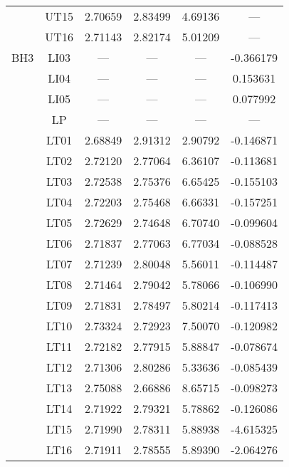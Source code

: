 \documentclass[utf8]{article}
\begin{document}
\begin{table}
{\begin{tabular}{cccccc}
            & UT15 & 2.70659 & 2.83499 & 4.69136 &     ---   \\
            & UT16 & 2.71143 & 2.82174 & 5.01209 &     ---   \\
        \hline
        BH3 & LI03 &   ---   &   ---   &   ---   & -0.366179 \\
            & LI04 &   ---   &   ---   &   ---   &  0.153631 \\
            & LI05 &   ---   &   ---   &   ---   &  0.077992 \\
            & LP   &   ---   &   ---   &   ---   &     ---   \\
            & LT01 & 2.68849 & 2.91312 & 2.90792 & -0.146871 \\
            & LT02 & 2.72120 & 2.77064 & 6.36107 & -0.113681 \\
            & LT03 & 2.72538 & 2.75376 & 6.65425 & -0.155103 \\
            & LT04 & 2.72203 & 2.75468 & 6.66331 & -0.157251 \\
            & LT05 & 2.72629 & 2.74648 & 6.70740 & -0.099604 \\
            & LT06 & 2.71837 & 2.77063 & 6.77034 & -0.088528 \\
            & LT07 & 2.71239 & 2.80048 & 5.56011 & -0.114487 \\
            & LT08 & 2.71464 & 2.79042 & 5.78066 & -0.106990 \\
            & LT09 & 2.71831 & 2.78497 & 5.80214 & -0.117413 \\
            & LT10 & 2.73324 & 2.72923 & 7.50070 & -0.120982 \\
            & LT11 & 2.72182 & 2.77915 & 5.88847 & -0.078674 \\
            & LT12 & 2.71306 & 2.80286 & 5.33636 & -0.085439 \\
            & LT13 & 2.75088 & 2.66886 & 8.65715 & -0.098273 \\
            & LT14 & 2.71922 & 2.79321 & 5.78862 & -0.126086 \\
            & LT15 & 2.71990 & 2.78311 & 5.88938 & -4.615325 \\
            & LT16 & 2.71911 & 2.78555 & 5.89390 & -2.064276 \\
        \hline
      \end{tabular}}
    \end{table}
\end{document}
